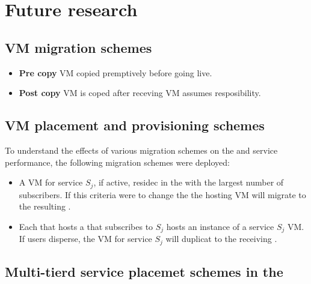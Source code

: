 \section{Future research}

\subsection{VM migration schemes}
\begin{itemize}
\item \textbf{Pre copy} VM copied premptively before going live.
\item \textbf{Post copy} VM is coped after receving VM assumes resposibility.
\end{itemize}

\subsection{VM placement and \dc{} provisioning schemes}
To understand the effects of various migration schemes on the \dc and service performance, the following migration schemes were deployed:

\begin{itemize}
\item A VM for service $S_j$, if active, residec in the \dc with the largest number of subscribers. If this criteria were to change the the hosting VM will migrate to the resulting \dc.
\item Each \dc that hosts a \ue that subscribes to $S_j$ hosts an instance of a service $S_j$ VM. If users disperse, the VM for service $S_j$ will duplicat to the receiving \dc.
\end{itemize}

\subsection{Multi-tierd service placemet schemes in the \xcloud{}}
